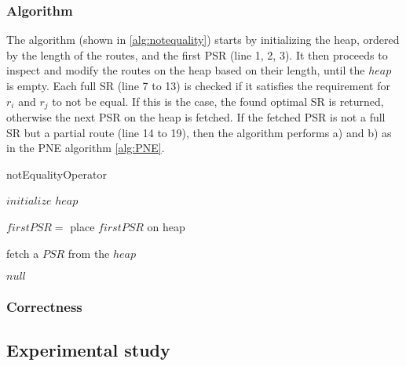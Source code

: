 \subsubsection{Algorithm}
\label{sec:algortihmNEO}
The algorithm (shown in \ref{alg:notequality}) starts by initializing the heap, ordered by the length of the routes, and the first PSR (line 1, 2, 3). It then proceeds to inspect and modify the routes on the heap based on their length, until the $heap$ is empty. Each full SR (line 7 to 13) is checked if it satisfies the requirement for $r_i$ and $r_j$ to not be equal. If this is the case, the found optimal SR is returned, otherwise the next PSR on the heap is fetched. If the fetched PSR is not a full SR but a partial route (line 14 to 19), then the algorithm performs a) and b) as in the PNE algorithm \ref{alg:PNE}. \newline

\begin{algorithm}[H]
	\label{alg:notequality}
	\caption{notEqualityOperator}
	
	\BlankLine
	
	$initialize$ $heap$\; 
	
	$firstPSR =$\;
	place $firstPSR$ on heap\;
	
	\BlankLine
	
	
	fetch a $PSR$ from the $heap$\;

	\Return $null$\;
	
	
\end{algorithm}

\subsubsection{Correctness}
\label{sec:correctnessNEO}

\subsection{Experimental study}
\label{sec:experimentsNEO}
